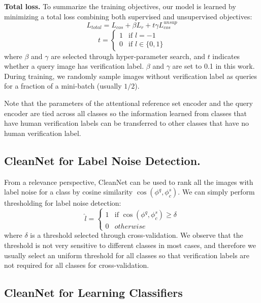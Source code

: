 \documentclass[10pt,twocolumn,letterpaper]{article}
\begin{document}
\noindent
\textbf{Total loss.} To summarize the training objectives, our model is learned by minimizing a total loss combining both supervised and unsupervised objectives:
\begin{equation}
L_{total} = L_{cos} + \beta L_{r} + t \gamma L_{cos}^{unsup}
\end{equation}
\begin{equation}
t = 
\begin{cases}
    1& \text{if } l = -1 \\
    0& \text{if } l \in \{0,1\}
\end{cases}
\end{equation}
where $\beta$ and $\gamma$ are selected through hyper-parameter search, and $t$ indicates whether a query image has verification label. $\beta$ and $\gamma$ are set to 0.1 in this work. During training, we randomly sample images without verification label as queries for a fraction of a mini-batch (usually $1/2$).

Note that the parameters of the attentional reference set encoder and the query encoder are tied across all classes so the information learned from classes that have human verification labels can be transferred to other classes that have no human verification label.

\subsection{CleanNet for Label Noise Detection.}
\label{sec:label-noise-detection}
From a relevance perspective, CleanNet can be used to rank all the images with label noise for a class by cosine similarity $\cos(\phi^q, \phi_c^s)$. We can simply perform thresholding for label noise detection:
\begin{equation}
\hat{l} = 
\begin{cases}
    1& \text{if } \cos(\phi^q, \phi_c^s) \geq \delta \\
    0& otherwise
\end{cases}
\label{eq:threshold}
\end{equation}
where $\delta$ is a threshold selected through cross-validation. We observe that the threshold is not very sensitive to different classes in most cases, and therefore we usually select an uniform threshold for all classes so that verification labels are not required for all classes for cross-validation.

\subsection{CleanNet for Learning Classifiers}
\label{sec:combine}
\end{document}
